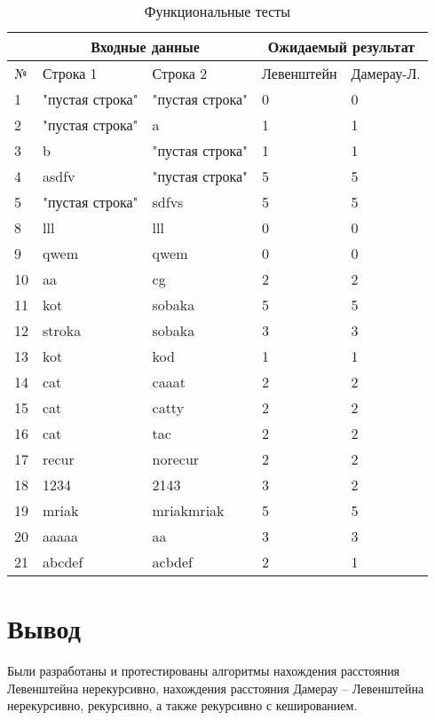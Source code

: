 \begin{table}[h]
    \begin{center}
    \begin{threeparttable}
    \captionsetup{justification=raggedright,singlelinecheck=off}	\caption{\label{tabular:functional_test} Функциональные тесты}
		\begin{tabular}{|l|l|l|l|l|}
			\hline
			&  \multicolumn{2}{c|}{Входные данные}& \multicolumn{2}{c|}{Ожидаемый результат} \\
			\hline
			№&Строка 1&Строка 2&Левенштейн&Дамерау-Л. \\
			\hline
			1&"пустая строка"&"пустая строка"&0&0 \\
			\hline
			2&"пустая строка"&a&1&1 \\
			\hline
			3&b&"пустая строка"&1&1 \\
			\hline
			4&asdfv&"пустая строка"&5&5 \\
			\hline
			5&"пустая строка"&sdfvs&5&5 \\
			\hline
			8&lll&lll&0&0 \\
			\hline
			9&qwem&qwem&0&0 \\
			\hline
			10&aa&cg&2&2 \\
			\hline
			11&kot&sobaka&5&5 \\
			\hline
			12&stroka&sobaka&3&3 \\
			\hline
			13&kot&kod&1&1 \\
			\hline
			14&cat&caaat&2&2 \\
			\hline
			15&cat&catty&2&2 \\
			\hline
			16&cat&tac&2&2 \\
			\hline
			17&recur&norecur&2&2 \\
			\hline
			18&1234&2143&3&2 \\
			\hline
			19&mriak&mriakmriak&5&5 \\
			\hline
			20&aaaaa&aa&3&3 \\
			\hline
            21&abcdef&acbdef&2&1\\
            \hline
		\end{tabular}
	\end{threeparttable}
	\end{center}
\end{table}

\section*{Вывод}

Были разработаны и протестированы алгоритмы нахождения расстояния Левенштейна нерекурсивно, нахождения расстояния Дамерау -- Левенштейна нерекурсивно, рекурсивно, а также рекурсивно с кешированием.
